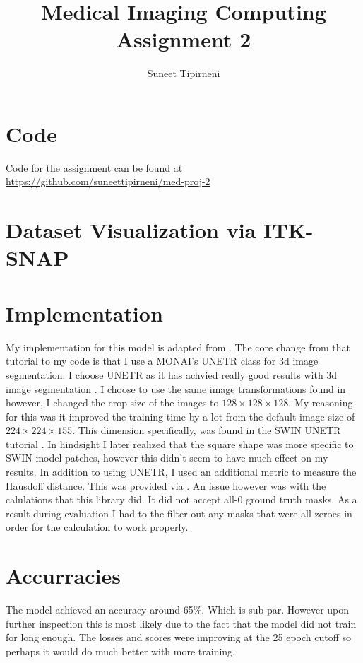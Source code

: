 \documentclass[onecolumn]{article}
\title{Medical Imaging Computing Assignment 2}
\author{Suneet Tipirneni}
\begin{document}
\maketitle
\section{Code}
Code for the assignment can be found at \url{https://github.com/suneettipirneni/med-proj-2}
\section{Dataset Visualization via ITK-SNAP}


\section{Implementation}

My implementation for this model is adapted from \cite{monaitutorial}. The core change from that tutorial to my code is that I use a MONAI's UNETR class for 3d image segmentation. I choose UNETR as it has achvied really good results with 3d image segmentation \cite{hatamizadeh2021unetr}. I choose to use the same image transformations found in \cite{monaitutorial} however, I changed the crop size of the images to $128\times 128 \times 128$. My reasoning for this was it improved the training time by a lot from the default image size of $224 \times 224 \times 155$. This dimension specifically, was found in the SWIN UNETR tutorial \cite{githubTutorialsswin_unetr_brats21_segmentation_3dipynbMain}. In hindsight I later realized that the square shape was more specific to SWIN model patches, however this didn't seem to have much effect on my results. In addition to using UNETR, I used an additional metric to measure the Hausdoff distance. This was provided via \cite{githubGitHubLolimedpy}. An issue however was with the calulations that this library did. It did not accept all-0 ground truth masks. As a result during evaluation I had to the filter out any masks that were all zeroes in order for the calculation to work properly.  

\section{Accurracies}

The model achieved an accuracy around 65\%. Which is sub-par. However upon further inspection this is most likely due to the fact that the model did not train for long enough. The losses and scores were improving at the 25 epoch cutoff so perhaps it would do much better with more training. 
\end{document}
